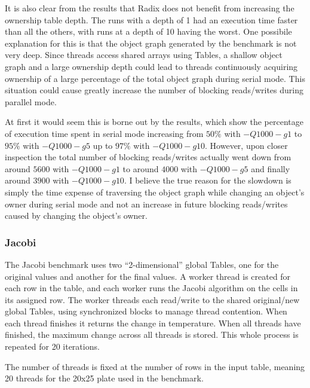 It is also clear from the results that Radix does not benefit from
increasing the ownership table depth.  The runs with a depth of 1 had
an execution time faster than all the others, with runs at a depth of
10 having the worst.  One possibile explanation for this is that the
object graph generated by the benchmark is not very deep.  Since
threads access shared arrays using Tables, a shallow object graph and
a large ownership depth could lead to threads continuously acquiring
ownership of a large percentage of the total object graph during
serial mode.  This situation could cause greatly increase the number
of blocking reads/writes during parallel mode.

At first it would seem this is borne out by the results, which show
the percentage of execution time spent in serial mode increasing from
$50\%$ with $-Q1000 -g1$ to $95\%$ with $-Q1000 -g5$ up to $97\%$ with
$-Q1000 -g10$.  However, upon closer inspection the total number of
blocking reads/writes actually went down from around $5600$ with
$-Q1000 -g1$ to around $4000$ with $-Q1000 -g5$ and finally around
$3900$ with $-Q1000 -g10$.  I believe the true reason for the slowdown
is simply the time expense of traversing the object graph while
changing an object's owner during serial mode and not an increase in
future blocking reads/writes caused by changing the object's owner.

\subsubsection{Jacobi}

The Jacobi benchmark uses two ``2-dimensional'' global Tables, one for
the original values and another for the final values.  A worker thread
is created for each row in the table, and each worker runs the Jacobi
algorithm on the cells in its assigned row.  The worker threads each
read/write to the shared original/new global Tables, using
synchronized blocks to manage thread contention.  When each thread
finishes it returns the change in temperature.  When all threads have
finished, the maximum change across all threads is stored.  This whole
process is repeated for 20 iterations.

The number of threads is fixed at the number of rows in the input
table, meaning 20 threads for the 20x25 plate used in the benchmark.

